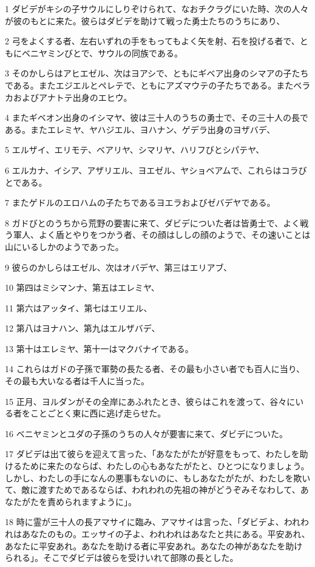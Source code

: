 \par 1 ダビデがキシの子サウルにしりぞけられて、なおチクラグにいた時、次の人々が彼のもとに来た。彼らはダビデを助けて戦った勇士たちのうちにあり、
\par 2 弓をよくする者、左右いずれの手をもってもよく矢を射、石を投げる者で、ともにベニヤミンびとで、サウルの同族である。
\par 3 そのかしらはアヒエゼル、次はヨアシで、ともにギベア出身のシマアの子たちである。またエジエルとペレテで、ともにアズマウテの子たちである。またベラカおよびアナトテ出身のエヒウ。
\par 4 またギベオン出身のイシマヤ、彼は三十人のうちの勇士で、その三十人の長である。またエレミヤ、ヤハジエル、ヨハナン、ゲデラ出身のヨザバデ、
\par 5 エルザイ、エリモテ、ベアリヤ、シマリヤ、ハリフびとシパテヤ、
\par 6 エルカナ、イシア、アザリエル、ヨエゼル、ヤショベアムで、これらはコラびとである。
\par 7 またゲドルのエロハムの子たちであるヨエラおよびゼバデヤである。
\par 8 ガドびとのうちから荒野の要害に来て、ダビデについた者は皆勇士で、よく戦う軍人、よく盾とやりをつかう者、その顔はししの顔のようで、その速いことは山にいるしかのようであった。
\par 9 彼らのかしらはエゼル、次はオバデヤ、第三はエリアブ、
\par 10 第四はミシマンナ、第五はエレミヤ、
\par 11 第六はアッタイ、第七はエリエル、
\par 12 第八はヨナハン、第九はエルザバデ、
\par 13 第十はエレミヤ、第十一はマクバナイである。
\par 14 これらはガドの子孫で軍勢の長たる者、その最も小さい者でも百人に当り、その最も大いなる者は千人に当った。
\par 15 正月、ヨルダンがその全岸にあふれたとき、彼らはこれを渡って、谷々にいる者をことごとく東に西に逃げ走らせた。
\par 16 ベニヤミンとユダの子孫のうちの人々が要害に来て、ダビデについた。
\par 17 ダビデは出て彼らを迎えて言った、「あなたがたが好意をもって、わたしを助けるために来たのならば、わたしの心もあなたがたと、ひとつになりましょう。しかし、わたしの手になんの悪事もないのに、もしあなたがたが、わたしを欺いて、敵に渡すためであるならば、われわれの先祖の神がどうぞみそなわして、あなたがたを責められますように」。
\par 18 時に霊が三十人の長アマサイに臨み、アマサイは言った、「ダビデよ、われわれはあなたのもの。エッサイの子よ、われわれはあなたと共にある。平安あれ、あなたに平安あれ。あなたを助ける者に平安あれ。あなたの神があなたを助けられる」。そこでダビデは彼らを受けいれて部隊の長とした。
